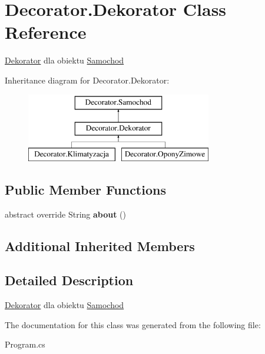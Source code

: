 \hypertarget{class_decorator_1_1_dekorator}{}\section{Decorator.\+Dekorator Class Reference}
\label{class_decorator_1_1_dekorator}


\hyperlink{class_decorator_1_1_dekorator}{Dekorator} dla obiektu \hyperlink{class_decorator_1_1_samochod}{Samochod}  


Inheritance diagram for Decorator.\+Dekorator\+:\begin{figure}[H]
\begin{center}
\leavevmode
\includegraphics[height=3.000000cm]{class_decorator_1_1_dekorator}
\end{center}
\end{figure}
\subsection*{Public Member Functions}
\begin{DoxyCompactItemize}
\item 
\mbox{\label{class_decorator_1_1_dekorator_a49bedb3447feedd5c1595ed048747756}} 
abstract override String {\bfseries about} ()
\end{DoxyCompactItemize}
\subsection*{Additional Inherited Members}


\subsection{Detailed Description}
\hyperlink{class_decorator_1_1_dekorator}{Dekorator} dla obiektu \hyperlink{class_decorator_1_1_samochod}{Samochod} 



The documentation for this class was generated from the following file\+:\begin{DoxyCompactItemize}
\item 
Program.\+cs\end{DoxyCompactItemize}
